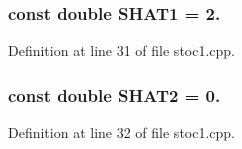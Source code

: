 \subsubsection[{S\-H\-A\-T1}]{\setlength{\rightskip}{0pt plus 5cm}const double S\-H\-A\-T1 = 2.}\label{toolboxes_2rnd_2stoc1_8cpp_a8e7d4cd2385c204ac111149508e32205}


Definition at line 31 of file stoc1.\-cpp.

\subsubsection[{S\-H\-A\-T2}]{\setlength{\rightskip}{0pt plus 5cm}const double S\-H\-A\-T2 = 0.}\label{toolboxes_2rnd_2stoc1_8cpp_a6eed178ee9af56838f8e0453ab986dc0}


Definition at line 32 of file stoc1.\-cpp.

